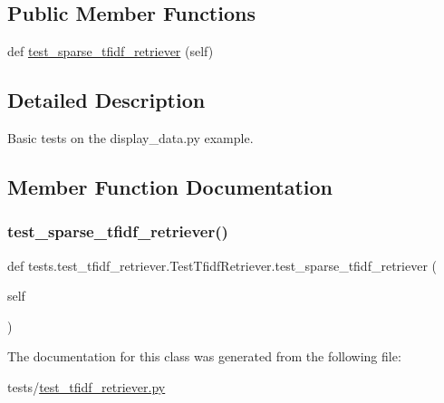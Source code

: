 \subsection*{Public Member Functions}
\begin{DoxyCompactItemize}
\item 
def \hyperlink{classtests_1_1test__tfidf__retriever_1_1TestTfidfRetriever_ad323cddfeb021a3b38a7eb4810d6ecdd}{test\+\_\+sparse\+\_\+tfidf\+\_\+retriever} (self)
\end{DoxyCompactItemize}


\subsection{Detailed Description}
\begin{DoxyVerb}Basic tests on the display_data.py example.
\end{DoxyVerb}
 

\subsection{Member Function Documentation}
\mbox{\label{classtests_1_1test__tfidf__retriever_1_1TestTfidfRetriever_ad323cddfeb021a3b38a7eb4810d6ecdd}} 
\subsubsection{\texorpdfstring{test\+\_\+sparse\+\_\+tfidf\+\_\+retriever()}{test\_sparse\_tfidf\_retriever()}}
{\footnotesize\ttfamily def tests.\+test\+\_\+tfidf\+\_\+retriever.\+Test\+Tfidf\+Retriever.\+test\+\_\+sparse\+\_\+tfidf\+\_\+retriever (\begin{DoxyParamCaption}\item[{}]{self }\end{DoxyParamCaption})}



The documentation for this class was generated from the following file\+:\begin{DoxyCompactItemize}
\item 
tests/\hyperlink{test__tfidf__retriever_8py}{test\+\_\+tfidf\+\_\+retriever.\+py}\end{DoxyCompactItemize}
